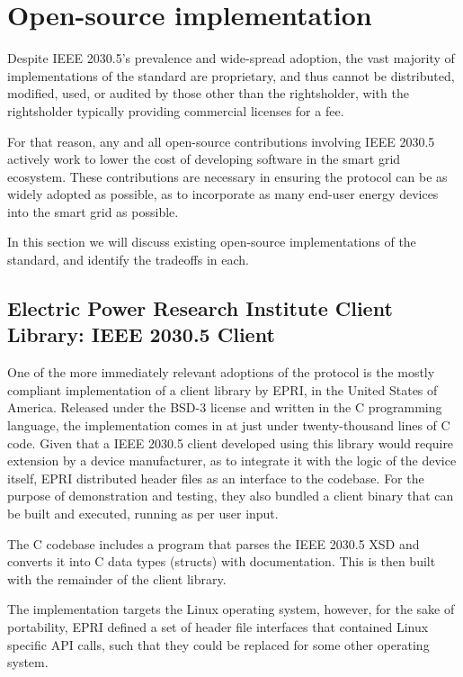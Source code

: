 \section{Open-source implementation}

Despite IEEE 2030.5's prevalence and wide-spread adoption, the vast majority of implementations of the standard are proprietary, and thus cannot be distributed, modified, used, or audited by those other than the rightsholder, with the rightsholder typically providing commercial licenses for a fee. 

For that reason, any and all open-source contributions involving IEEE 2030.5 actively work to lower the cost of developing software in the smart grid ecosystem. These contributions are necessary in ensuring the protocol can be as widely adopted as possible, as to incorporate as many end-user energy devices into the smart grid as possible.

In this section we will discuss existing open-source implementations of the standard, and identify the tradeoffs in each.

\subsection{Electric Power Research Institute Client Library: IEEE 2030.5 Client}
One of the more immediately relevant adoptions of the protocol is the mostly compliant implementation of a client library by EPRI, in the United States of America.
Released under the BSD-3 license and written in the C programming language, the implementation comes in at just under twenty-thousand lines of C code.
Given that a IEEE 2030.5 client developed using this library would require extension by a device manufacturer, as to integrate it with the logic of the device itself, EPRI distributed header files as an interface to the codebase.
For the purpose of demonstration and testing, they also bundled a client binary that can be built and executed, running as per user input.

The C codebase includes a program that parses the IEEE 2030.5 XSD and converts it into C data types (structs) with documentation. This is then built with the remainder of the client library.

The implementation targets the Linux operating system, however, for the sake of portability, EPRI defined a set of header file interfaces that contained Linux specific API calls, such that they could be replaced for some other operating system.

